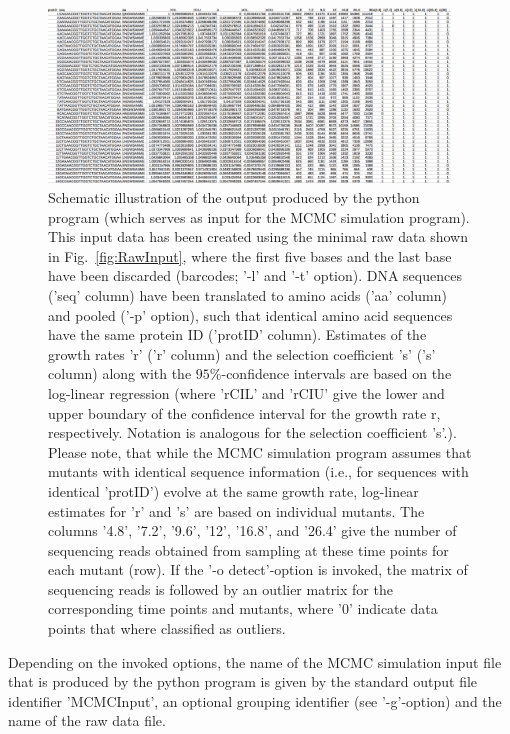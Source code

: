 \documentclass[12pt,a4paper]{scrartcl}
\begin{document}
\begin{figure}
\centering \includegraphics[width=0.95\textwidth]{MCMC-InputExample.png}
\caption{Schematic illustration of the output produced by the python program (which serves as input for the MCMC simulation program). This input data has been created using the minimal raw data shown in Fig.~\ref{fig:RawInput}, where the first five bases and the last base have been discarded (barcodes; '-l' and '-t' option). DNA sequences ('seq' column) have been translated to amino acids ('aa' column) and pooled ('-p' option), such that identical amino acid sequences have the same protein ID ('protID' column). Estimates of the growth rates 'r' ('r' column) and the selection coefficient 's' ('s' column) along with the $95\%$-confidence intervals are based on the log-linear regression (where 'rCIL' and 'rCIU' give the lower and upper boundary of the confidence interval for the growth rate r, respectively. Notation is analogous for the selection coefficient 's'.). Please note, that while the MCMC simulation program assumes that mutants with identical sequence information (i.e., for sequences with identical 'protID') evolve at the same growth rate, log-linear estimates for 'r' and 's' are based on individual mutants.
The columns '4.8', '7.2', '9.6', '12', '16.8', and '26.4' give the number of sequencing reads obtained from sampling at these time points for each mutant (row). If the '-o detect'-option is invoked, the matrix of sequencing reads is followed by an outlier matrix for the corresponding time points and mutants, where '0' indicate data points that where classified as outliers.\label{fig:PythonOutput}}
\end{figure}

Depending on the invoked options, the name of the MCMC simulation input file that is produced by the python program is given by the standard output file identifier 'MCMCInput', an optional grouping identifier (see '-g'-option) and the name of the raw data file.
\end{document}
